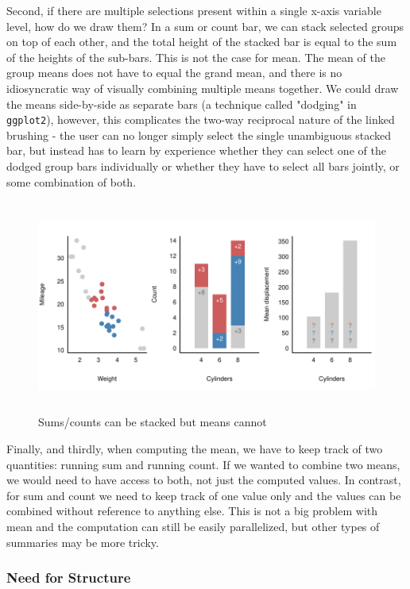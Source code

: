 \documentclass[12pt,a4paper]{article}
\begin{document}
Second, if there are multiple selections present within a single x-axis variable level, how do we draw them? In a sum or count bar, we can stack selected groups on top of each other, and the total height of the stacked bar is equal to the sum of the heights of the sub-bars. This is not the case for mean. The mean of the group means does not have to equal the grand mean, and there is no idiosyncratic way of visually combining multiple means together. We could draw the means side-by-side as separate bars (a technique called "dodging" in \texttt{ggplot2}), however, this complicates the two-way reciprocal nature of the linked brushing - the user can no longer simply select the single unambiguous stacked bar, but instead has to learn by experience whether they can select one of the dodged group bars individually or whether they have to select all bars jointly, or some combination of both.

\begin{figure}[H]
\centering
\includegraphics[height=70mm]{./figure02.pdf}
\caption{Sums/counts can be stacked but means cannot}
\label{fig:empty}
\end{figure}

Finally, and thirdly, when computing the mean, we have to keep track of two quantities: running sum and running count. If we wanted to combine two means, we would need to have access to both, not just the computed values. In contrast, for sum and count we need to keep track of one value only and the values can be combined without reference to anything else. This is not a big problem with mean and the computation can still be easily parallelized, but other types of summaries may be more tricky.

\subsubsection{Need for Structure}
\end{document}
